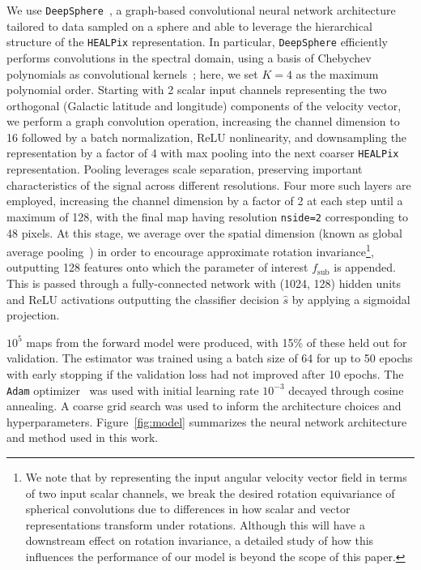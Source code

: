 \documentclass[preprint]{article}
\begin{document}
We use \texttt{DeepSphere}~\cite{defferrard2020deepsphere,Perraudin:2018rbt}, a graph-based convolutional neural network architecture tailored to data sampled on a sphere and able to leverage the hierarchical structure of the \texttt{HEALPix} representation. In particular, \texttt{DeepSphere} efficiently performs convolutions in the spectral domain, using a basis of Chebychev polynomials as convolutional kernels~\cite{defferrard2016convolutional}; here, we set $K=4$ as the maximum polynomial order. Starting with 2 scalar input channels representing the two orthogonal (Galactic latitude and longitude) components of the velocity vector, we perform a graph convolution operation, increasing the channel dimension to 16 followed by a batch normalization, ReLU nonlinearity, and downsampling the representation by a factor of 4 with max pooling into the next coarser \texttt{HEALPix} representation. Pooling leverages scale separation, preserving important characteristics of the signal across different resolutions. 
Four more such layers are employed, increasing the channel dimension by a factor of 2 at each step until a maximum of 128, with the final map having resolution \texttt{nside=2} corresponding to 48 pixels. At this stage, we average over the spatial dimension (known as global average pooling~\cite{lin2014network}) in order to encourage approximate rotation invariance\footnote{We note that by representing the input angular velocity vector field in terms of two input scalar channels, we break the desired rotation equivariance of spherical convolutions due to differences in how scalar and vector representations transform under rotations. Although this will have a downstream effect on rotation invariance, a detailed study of how this influences the performance of our model is beyond the scope of this paper.}, outputting 128 features onto which the parameter of interest $f_\mathrm{sub}$ is appended. This is passed through a fully-connected network with (1024, 128) hidden units and ReLU activations outputting the classifier decision $\hat s$ by applying a sigmoidal projection.

\bigskip

$10^5$ maps from the forward model were produced, with 15\% of these held out for validation. The estimator was trained using a batch size of 64 for up to 50 epochs with early stopping if the validation loss had not improved after 10 epochs. The \texttt{Adam} optimizer~\cite{kingma2017adam} was used with initial learning rate $10^{-3}$ decayed through cosine annealing. A coarse grid search was used to inform the architecture choices and hyperparameters. 
Figure~\ref{fig:model} summarizes the neural network architecture and method used in this work.
\end{document}
